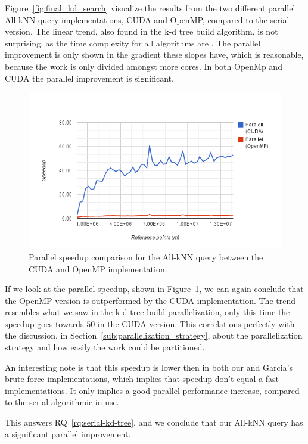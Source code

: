 Figure~\ref{fig:final_kd_search} visualize the results from the two different parallel All-kNN query implementations, CUDA and OpenMP, compared to the serial version. The linear trend, also found in the k-d tree build algorithm, is not surprising, as the time complexity for all algorithms are . The parallel improvement is only shown in the gradient these slopes have, which is reasonable, because the work is only divided amongst more cores. In both OpenMp and CUDA the parallel improvement is significant.

\begin{figure}[ht!]
    \centering
    \includegraphics[width=120mm]{../gfx/final_kd_search_speedup.png}
    \caption{Parallel speedup comparison for the All-kNN query between the CUDA and OpenMP implementation.}
    \label{fig:final_kd_search_speedup}
\end{figure}

If we look at the parallel speedup, shown in Figure~\ref{fig:final_kd_search_speedup}, we can again conclude that the OpenMP version is outperformed by the CUDA implementation. The trend resembles what we saw in the k-d tree build parallelization, only this time the speedup goes towards $50$ in the CUDA version. This correlations perfectly with the discussion, in Section~\ref{sub:parallelization_strategy}, about the parallelization strategy and how easily the work could be partitioned.      

An interesting note is that this speedup is lower then in both our and Garcia's\cite{Garcia2008} brute-force implementations, which implies that speedup don't equal a fast implementations. It only implies a good parallel performance increase, compared to the serial algorithmic in use.

This answers RQ~\ref{rq:serial-kd-tree}, and we conclude that our All-kNN query has a significant parallel improvement.
